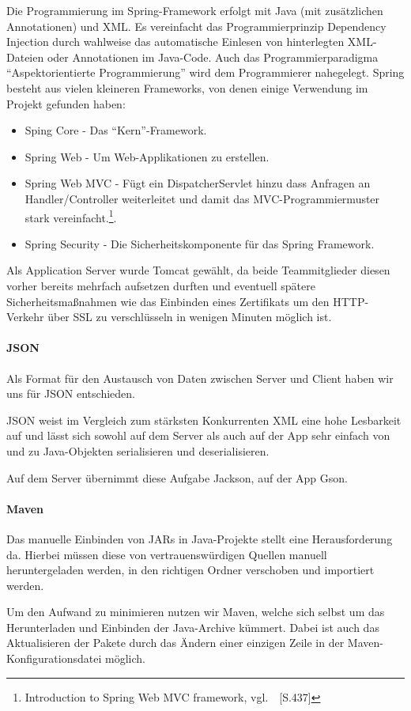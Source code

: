 Die Programmierung im Spring-Framework erfolgt mit Java (mit zusätzlichen Annotationen) und XML. Es vereinfacht das Programmierprinzip Dependency Injection durch wahlweise das automatische Einlesen von hinterlegten XML-Dateien oder Annotationen im Java-Code. Auch das Programmierparadigma ``Aspektorientierte Programmierung'' wird dem Programmierer nahegelegt.
Spring besteht aus vielen kleineren Frameworks, von denen einige Verwendung im Projekt gefunden haben:
\begin{itemize}
\item Sping Core - Das ``Kern''-Framework.
\item Spring Web - Um Web-Applikationen zu erstellen.
\item Spring Web MVC - Fügt ein DispatcherServlet hinzu dass Anfragen an Handler/Controller weiterleitet und damit das MVC-Programmiermuster stark vereinfacht.\footnote{Introduction to Spring Web MVC framework, vgl.~\cite{webmvc}~[S.437]}. 
\item Spring Security - Die Sicherheitskomponente für das Spring Framework.
\end{itemize}

Als Application Server wurde Tomcat gewählt, da beide Teammitglieder diesen vorher bereits mehrfach aufsetzen durften und eventuell spätere Sicherheitsmaßnahmen wie das Einbinden eines Zertifikats um den HTTP-Verkehr über SSL zu verschlüsseln in wenigen Minuten möglich ist.
\paragraph{JSON}
Als Format für den Austausch von Daten zwischen Server und Client haben wir uns für JSON entschieden.

JSON weist im Vergleich zum stärksten Konkurrenten XML eine hohe Lesbarkeit auf und lässt sich sowohl auf dem Server als auch auf der App sehr einfach von und zu Java-Objekten serialisieren und deserialisieren.

Auf dem Server übernimmt diese Aufgabe Jackson, auf der App Gson.
\paragraph{Maven}
Das manuelle Einbinden von JARs in Java-Projekte stellt eine Herausforderung da. Hierbei müssen diese von vertrauenswürdigen Quellen manuell heruntergeladen werden, in den richtigen Ordner verschoben und importiert werden.

Um den Aufwand zu minimieren nutzen wir Maven, welche sich selbst um das Herunterladen und Einbinden der Java-Archive kümmert. Dabei ist auch das Aktualisieren der Pakete durch das Ändern einer einzigen Zeile in der Maven-Konfigurationsdatei möglich.
